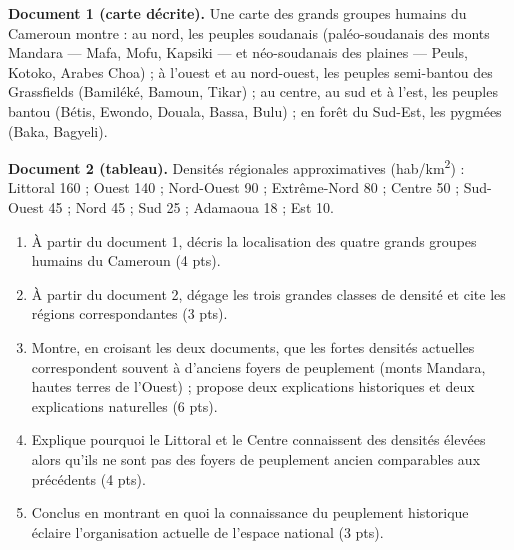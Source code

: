 \documentclass[11pt]{article}
\begin{document}
\begin{exercice}
\textbf{Document 1 (carte décrite).} Une carte des grands groupes humains du Cameroun montre : au nord, les peuples soudanais (paléo-soudanais des monts Mandara — Mafa, Mofu, Kapsiki — et néo-soudanais des plaines — Peuls, Kotoko, Arabes Choa) ; à l'ouest et au nord-ouest, les peuples semi-bantou des Grassfields (Bamiléké, Bamoun, Tikar) ; au centre, au sud et à l'est, les peuples bantou (Bétis, Ewondo, Douala, Bassa, Bulu) ; en forêt du Sud-Est, les pygmées (Baka, Bagyeli).

\textbf{Document 2 (tableau).} Densités régionales approximatives (hab/km\textsuperscript{2}) : Littoral 160 ; Ouest 140 ; Nord-Ouest 90 ; Extrême-Nord 80 ; Centre 50 ; Sud-Ouest 45 ; Nord 45 ; Sud 25 ; Adamaoua 18 ; Est 10.

\begin{enumerate}
\item À partir du document 1, décris la localisation des quatre grands groupes humains du Cameroun (4 pts).
\item À partir du document 2, dégage les trois grandes classes de densité et cite les régions correspondantes (3 pts).
\item Montre, en croisant les deux documents, que les fortes densités actuelles correspondent souvent à d'anciens foyers de peuplement (monts Mandara, hautes terres de l'Ouest) ; propose deux explications historiques et deux explications naturelles (6 pts).
\item Explique pourquoi le Littoral et le Centre connaissent des densités élevées alors qu'ils ne sont pas des foyers de peuplement ancien comparables aux précédents (4 pts).
\item Conclus en montrant en quoi la connaissance du peuplement historique éclaire l'organisation actuelle de l'espace national (3 pts).
\end{enumerate}
\end{exercice}
\end{document}
